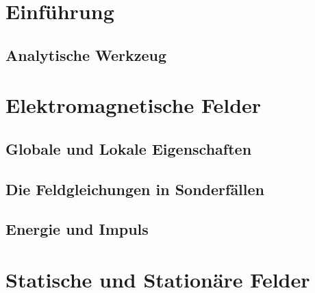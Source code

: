 	
	\tableofcontents %
	
	
	\section{Einführung} %
	\subsection{Analytische Werkzeug}
	
	
	
	\section{Elektromagnetische Felder}
	\subsection{Globale und Lokale Eigenschaften}
	
	
	
	\subsection{Die Feldgleichungen in Sonderfällen}
	
	
	
	\subsection{Energie und Impuls}
	
	
	
	\section{Statische und Stationäre Felder}
